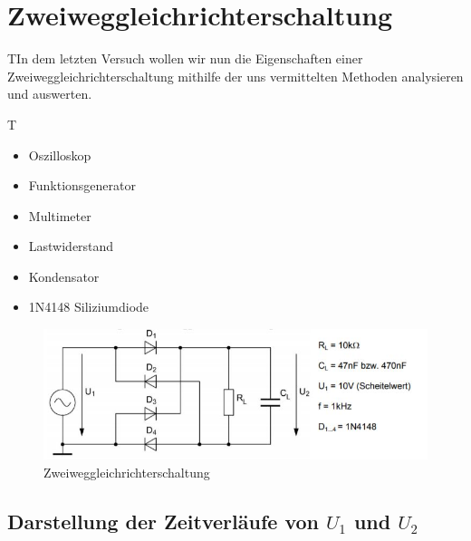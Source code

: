 \documentclass{article}
\begin{document}
\section{Zweiweggleichrichterschaltung}

\begin{task}
  TIn dem letzten Versuch wollen wir nun die Eigenschaften einer Zweiweggleichrichterschaltung mithilfe der uns vermittelten
  Methoden analysieren und auswerten.
\end{task}

\begin{devlist}
  T\begin{itemize}
    \item Oszilloskop
    \item Funktionsgenerator
    \item Multimeter
    \item Lastwiderstand
    \item Kondensator
    \item 1N4148 Siliziumdiode
  \end{itemize}
\end{devlist}

\begin{figure}[h]
  \begin{center}
    \includegraphics{../assets/images/EL1P2/aufgabe 4 schaltung.JPG}
    \caption{Zweiweggleichrichterschaltung}
  \end{center}
\end{figure}

\newpage

\subsection{Darstellung der Zeitverläufe von $U_1$ und $U_2$}
\end{document}
